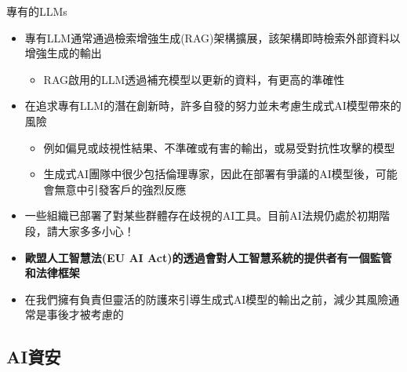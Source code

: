\documentclass[aspectratio=1610]{Common/MyCourseBeamer}
\begin{document}
\begin{frame}[allowframebreaks]{專有的LLMs}
\begin{itemize}
		\item 專有LLM通常通過檢索增強生成(RAG)架構擴展，該架構即時檢索外部資料以增強生成的輸出
			\begin{itemize}
				\item RAG啟用的LLM透過補充模型以更新的資料，有更高的準確性
			\end{itemize}
		
		\item 在追求專有LLM的潛在創新時，許多自發的努力並未考慮生成式AI模型帶來的風險
		\begin{itemize}
			\item 例如偏見或歧視性結果、不準確或有害的輸出，或易受對抗性攻擊的模型
			
			\item 生成式AI團隊中很少包括倫理專家，因此在部署有爭議的AI模型後，可能會無意中引發客戶的強烈反應
		\end{itemize}
		
		\item 一些組織已部署了對某些群體存在歧視的AI工具。目前AI法規仍處於初期階段，請大家多多小心！
		
		\item \textbf{\color{darkred}
			{歐盟人工智慧法(EU AI Act)的透過會對人工智慧系統的提供者有一個監管和法律框架}}
		
		\item 在我們擁有負責但靈活的防護來引導生成式AI模型的輸出之前，減少其風險通常是事後才被考慮的
	\end{itemize}
	
\end{frame}

\subsection{AI資安}
\end{document}
